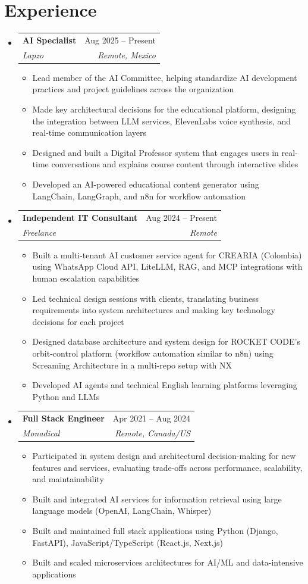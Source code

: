 \documentclass[letterpaper,11pt]{article}
\makeatletter
\newcommand{\resumeSubheading}[4]{
  \vspace{-2pt}
  \item[]
  \begin{tabular*}{\textwidth}{@{\extracolsep{\fill}}l r}
    \textbf{#1} & #2 \\
    \textit{#3} & \textit{#4} \\
  \end{tabular*}
  \vspace{-5pt}
}
\makeatother
\begin{document}
\section{Experience}
\begin{itemize}[leftmargin=0pt, itemindent=0pt, label={}, itemsep=1pt]
\resumeSubheading
{AI Specialist}{Aug 2025 -- Present}
{Lapzo}{Remote, Mexico}
\begin{itemize}[leftmargin=*, itemsep=0pt]
    \item Lead member of the AI Committee, helping standardize AI development practices and project guidelines across the organization
    \item Made key architectural decisions for the educational platform, designing the integration between LLM services, ElevenLabs voice synthesis, and real-time communication layers
    \item Designed and built a Digital Professor system that engages users in real-time conversations and explains course content through interactive slides
    \item Developed an AI-powered educational content generator using LangChain, LangGraph, and n8n for workflow automation
\end{itemize}

\resumeSubheading
{Independent IT Consultant}{Aug 2024 -- Present}
{Freelance}{Remote}
\begin{itemize}[leftmargin=*, itemsep=0pt]
    \item Built a multi-tenant AI customer service agent for CREARIA (Colombia) using WhatsApp Cloud API, LiteLLM, RAG, and MCP integrations with human escalation capabilities
    \item Led technical design sessions with clients, translating business requirements into system architectures and making key technology decisions for each project
    \item Designed database architecture and system design for ROCKET CODE's orbit-control platform (workflow automation similar to n8n) using Screaming Architecture in a multi-repo setup with NX
    \item Developed AI agents and technical English learning platforms leveraging Python and LLMs
\end{itemize}

\resumeSubheading
{Full Stack Engineer}{Apr 2021 -- Aug 2024}
{Monadical}{Remote, Canada/US}
\begin{itemize}[leftmargin=*, itemsep=0pt]
    \item Participated in system design and architectural decision-making for new features and services, evaluating trade-offs across performance, scalability, and maintainability
    \item Built and integrated AI services for information retrieval using large language models (OpenAI, LangChain, Whisper)
    \item Built and maintained full stack applications using Python (Django, FastAPI), JavaScript/TypeScript (React.js, Next.js)
    \item Built and scaled microservices architectures for AI/ML and data-intensive applications
\end{itemize}


\end{itemize}
\end{document}
